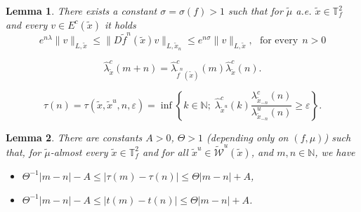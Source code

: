 \documentclass[10pt,a4paper]{amsart}
\newtheorem{lemma}{Lemma}
\newcommand{\N}{{\mathbb N}}
\newcommand{\TTf}{{\mathbb{T}_f^2}}
\newcommand{\cW}{{\mathcal W}}
\newcommand{\tif}{\tilde{f}}
\newcommand{\tix}{\tilde{x}}
\newcommand{\w}{\widetilde{\cW}}
\begin{document}
\begin{lemma}
    \label{lem:crescelyapunovcresce}
There exists a constant $\sigma=\sigma(f)>1$ such that for $\tilde{\mu}$ a.e. $\tix\in\TTf$ and every $v\in E^c(\tix)$ it holds 
\[
e^{n\lambda}\|v\|_{L,\tix}\leq\|D\tif^n(\tix)v\|_{L,\tix_n}\leq e^{n\sigma}\|v\|_{L,\tix},\:\:\:\textrm{for every}\:\:n>0
\]
\end{lemma}

 \begin{equation}
     \label{eq:cocycle}
     \hat{\lambda}^c_{\tix}(m+n) = \hat{\lambda}^c_{\tilde{f}^n(\tilde{x})}(m) \hat{\lambda}^c_{\tix}(n). 
 \end{equation}

\begin{equation}
	\label{eq:tau}
 \tau(n)=\tau(\tix,\tix^u,n,\varepsilon) = \inf \left\{ k\in\N; \; \hat{\lambda}^c_{\tix^u}(k) \frac{\lambda^c_{\tix_{-n}}(n)}{\lambda^u_{\tix_{-n}}(n)} \geq \varepsilon \right\}. 	
\end{equation}

\begin{lemma}
\label{lem:quasiisometric}
There are constants $A >0$, $\Theta > 1$ (depending only on $(f,\mu)$) such that, for $\tilde{\mu}$-almost every $\tix \in \TTf$ and for all $\tix^u \in \w^u(\tix)$, and $m,n \in \N$, we have
\begin{itemize}
	\item $\Theta^{-1}|m - n|-A\leq|\tau(m)-\tau(n)|\leq \Theta|m - n|+A$,
	\item $\Theta^{-1}|m - n|-A\leq|t(m)-t(n)|\leq \Theta|m - n|+A$.
\end{itemize}
\end{lemma}
\end{document}
